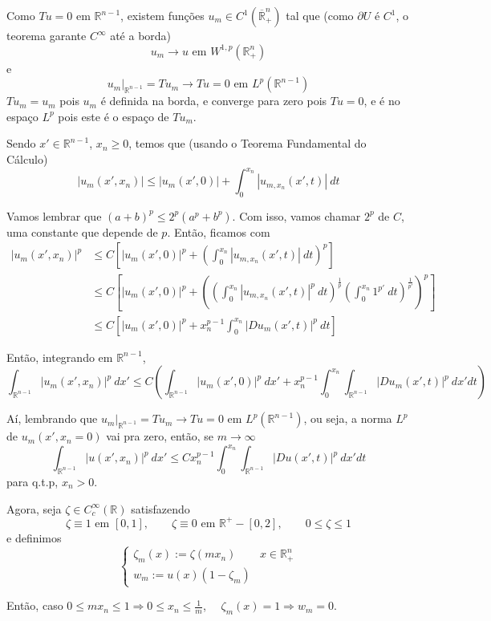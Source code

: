 \documentclass[a4paper, 11pt]{article}
\newcommand{\R}{\mathbb{R}}
\newcommand{\pu}{\partial U}
\begin{document}
Como $ Tu=0 $ em $ \R^{n-1} $, existem funções $ u_m \in C^1(\overline{\R}^n_+) $ tal que (como $\pu$ é $C^1$, o teorema garante $C^\infty$ até a borda) \[ u_m \rightarrow u  \text{ em } W^{1,p}(\R^n_+)\] e \[ u_m |_{\R^{n-1}} = Tu_m  \rightarrow Tu =0  \text{ em } L^p(\R^{n-1})\] $ Tu_m=u_m $ pois $ u_m $ é definida na borda, e converge para zero pois $Tu=0$, e é no espaço $ L^p $ pois este é o espaço de $ Tu_m $.

Sendo $ x' \in \R^{n-1} $, $ x_n\geq0 $, temos que (usando o Teorema Fundamental do Cálculo) \[ \left| u_m(x', x_n) \right| \leq | u_m(x',0) | + \int_0^{x_n} |u_{m,x_n}(x',t)| \ dt   \] 

Vamos lembrar que \( (a+b)^p \leq 2^p (a^p + b^p) \). Com isso, vamos chamar \( 2^p \) de $C$, uma constante que depende de $p$. Então, ficamos com \begin{align*}
	\left| u_m(x', x_n) \right|^p &\leq C \left[ | u_m(x',0) |^p + \left( \int_0^{x_n} |u_{m,x_n}(x',t)| \ dt \right)^p \right] \\
	&\leq C \left[ | u_m(x',0) |^p + \left( \left(\int_0^{x_n} |u_{m,x_n}(x',t)|^p \ dt\right)^{\frac{1}{p}} \left(\int_0^{x_n}1^{p'}\ dt\right)^{\frac{1}{p'}}  \right)^p \right] \\
	&\leq C\left[ | u_m(x',0) |^p + x_n^{p-1} \int_0^{x_n} |Du_{m}(x',t)|^{p}\ dt \right]
\end{align*}



Então, integrando em $\R^{n-1}$, \[ \int_{\R^{n-1}} | u_m(x',x_n) |^p\ dx' \leq C \left(  \int_{\R^{n-1}} | u_m(x',0) |^p \ dx' + x_n^{p-1} \int_0^{x_n} \int_{\R^{n-1}} | Du_m(x',t)|^p\ dx' dt  \right)\]

Aí, lembrando que $ u_m |_{\R^{n-1}} = Tu_m \rightarrow Tu=0 \text{ em } L^p(\R^{n-1})$, ou seja, a norma $L^p$ de $u_m(x',x_n=0)$ vai pra zero, então, se $m \rightarrow \infty$ \[  \int_{\R^{n-1}} | u(x',x_n) |^p\ dx' \leq C  x_n^{p-1} \int_0^{x_n} \int_{\R^{n-1}} | Du(x',t)|^p\ dx' dt  \] para q.t.p, $x_n>0$.


Agora, seja $\zeta \in C^\infty_c(\R)$ satisfazendo \[ \zeta \equiv 1 \text{ em } [0,1], \qquad \zeta \equiv 0 \text{ em } \R^+ - [0,2], \qquad 0 \leq \zeta \leq 1 \] e definimos \[ \begin{cases}
	\zeta_m(x) := \zeta (mx_n) & x \in \R^n_+ \\
	w_m := u(x)(1 - \zeta_m)
\end{cases} \]

Então, caso $ 0 \leq mx_n \leq 1 \Rightarrow 0 \leq x_n \leq \frac{1}{m} $, $\quad \zeta_m(x)=1 \Rightarrow w_m=0$.
\end{document}
